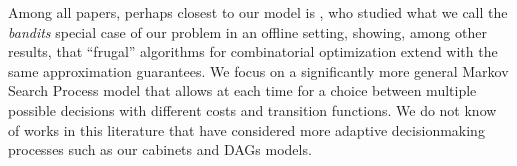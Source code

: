 Among all papers, perhaps closest to our model is \citet{gupta2019markovian}, who studied what we call the \emph{bandits} special case of our problem in an offline setting, showing, among other results, that ``frugal'' algorithms for combinatorial optimization extend with the same approximation guarantees.
We focus on a significantly more general Markov Search Process model that allows at each time for a choice between multiple possible decisions with different costs and transition functions.
We do not know of works in this literature that have considered more adaptive decisionmaking processes such as our cabinets and DAGs models.